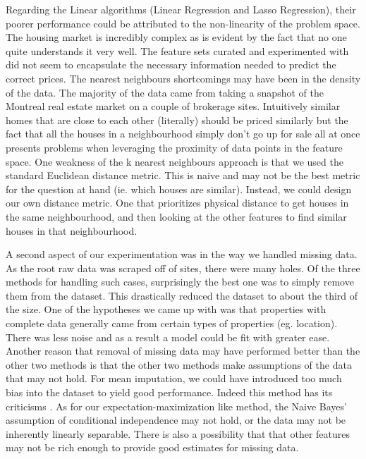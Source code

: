 \documentclass{acm_proc_article-sp}
\begin{document}
	Regarding the Linear algorithms (Linear Regression and Lasso Regression), their poorer performance could be attributed to the non-linearity of the problem space. The housing market is incredibly complex as is evident by the fact that no one quite understands it very well. The feature sets curated and experimented with did not seem to encapsulate the necessary information needed to predict the correct prices. The nearest neighbours shortcomings may have been in the density of the data. The majority of the data came from taking a snapshot of the Montreal real estate market on a couple of brokerage sites. Intuitively similar homes that are close to each other (literally) should be priced similarly but the fact that all the houses in a neighbourhood simply don't go up for sale all at once presents problems when leveraging the proximity of data points in the feature space. One weakness of the k nearest neighbours approach is that we used the standard Euclidean distance metric. This is naive and may not be the best metric for the question at hand (ie. which houses are similar). Instead, we could design our own distance metric. One that prioritizes physical distance to get houses in the same neighbourhood, and then looking at the other features to find similar houses in that neighbourhood.
	
	A second aspect of our experimentation was in the way we handled missing data. As the root raw data was scraped off of sites, there were many holes. Of the three methods for handling such cases, surprisingly the best one was to simply remove them from the dataset. This drastically reduced the dataset to about the third of the size. One of the hypotheses we came up with was that properties with complete data generally came from certain types of properties (eg. location). There was less noise and as a result a model could be fit with greater ease. Another reason that removal of missing data may have performed better than the other two methods is that the other two methods make assumptions of the data that may not hold. For mean imputation, we could have introduced too much bias into the dataset to yield good performance. Indeed this method has its criticisms \cite{meancrit}. As for our expectation-maximization like method, the Naive Bayes' assumption of conditional independence may not hold, or the data may not be inherently linearly separable. There is also a possibility that that other features may not be rich enough to provide good estimates for missing data.
	
\end{document}

